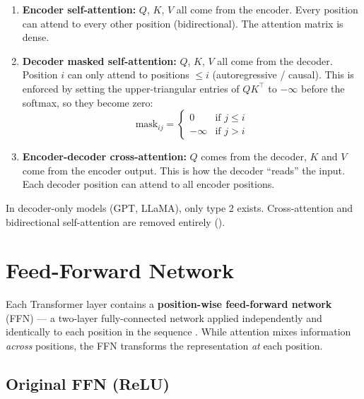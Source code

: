 \documentclass[11pt,a4paper]{article}
\begin{document}
\begin{enumerate}[nosep]
  \item \textbf{Encoder self-attention:} $Q$, $K$, $V$ all come from the encoder.
    Every position can attend to every other position (bidirectional). The attention
    matrix is dense.

  \item \textbf{Decoder masked self-attention:} $Q$, $K$, $V$ all come from the decoder.
    Position $i$ can only attend to positions $\leq i$ (autoregressive / causal). This
    is enforced by setting the upper-triangular entries of $QK^\top$ to $-\infty$ before
    the softmax, so they become zero:
    \begin{equation}
      \text{mask}_{ij} =
      \begin{cases}
        0 & \text{if } j \leq i \\
        -\infty & \text{if } j > i
      \end{cases}
    \end{equation}

  \item \textbf{Encoder-decoder cross-attention:} $Q$ comes from the decoder, $K$ and $V$
    come from the encoder output. This is how the decoder ``reads'' the input. Each
    decoder position can attend to all encoder positions.
\end{enumerate}

In decoder-only models (GPT, LLaMA), only type 2 exists. Cross-attention and bidirectional
self-attention are removed entirely ().


\section{Feed-Forward Network}
\label{sec:ffn}

Each Transformer layer contains a \textbf{position-wise feed-forward network} (FFN) ---
a two-layer fully-connected network applied independently and identically to each position
in the sequence \cite{vaswani2017}. While attention mixes information \emph{across}
positions, the FFN transforms the representation \emph{at} each position.

\subsection{Original FFN (ReLU)}
\end{document}
